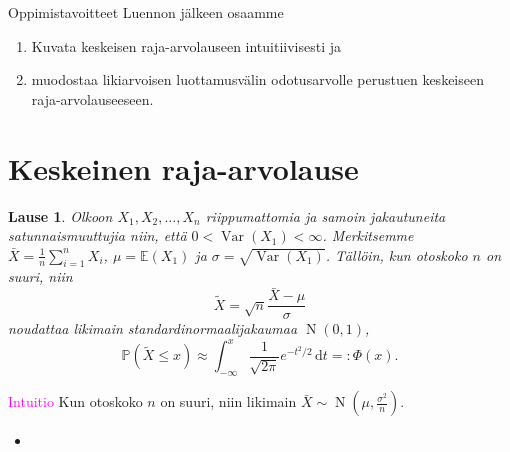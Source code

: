 \documentclass{beamer}
\newtheorem{teoreema}{Lause}
\DeclareMathOperator{\var}{Var}
\DeclareMathOperator{\n}{\mathrm N}
\begin{document}

\begin{frame}{Oppimistavoitteet}
  Luennon jälkeen osaamme
  \begin{enumerate}
    \item Kuvata keskeisen raja-arvolauseen intuitiivisesti ja
    \pause
    \item muodostaa likiarvoisen luottamusvälin odotusarvolle perustuen
    keskeiseen raja-arvolauseeseen.
  \end{enumerate}
\end{frame}


\section{Keskeinen raja-arvolause}


\begin{frame}
  \begin{teoreema}
    Olkoon $X_1, X_2, \ldots, X_n$ riippumattomia ja samoin jakautuneita
    satunnaismuuttujia niin, että $0 < \var\left(X_1\right) < \infty$.
    Merkitsemme $\bar X = \frac{1}{n}\sum_{i = 1}^n X_i$, $\mu =
    \mathbb{E}\left(X_1\right)$ ja $\sigma = \sqrt{\var\left(X_1\right)}$.
    Tällöin, kun otoskoko $n$ on suuri, niin
    \begin{equation*}
      \tilde X = \sqrt{n}\frac{\bar X - \mu}{\sigma}
    \end{equation*}
    noudattaa likimain standardinormaalijakaumaa $\n\left(0, 1\right)$,
    \pause
    \begin{equation*}
      \mathbb{P}\left(\tilde X \leq x\right) \approx
      \int_{-\infty}^x \frac{1}{\sqrt{2\pi}}e^{-t^2/2}\,\mathrm{d}t =:
      \Phi\left(x\right).
    \end{equation*}
  \end{teoreema}
\end{frame}


\begin{frame}{\textcolor{magenta}{Intuitio}}
  Kun otoskoko $n$ on suuri, niin likimain $\bar X \sim \n\left(\mu,
  \frac{\sigma^2}{n}\right)$.
  \begin{itemize}
    \item[]
  \end{itemize}
\end{frame}
\end{document}

